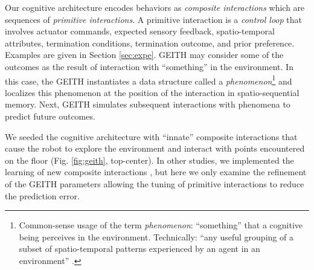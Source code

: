 \documentclass[runningheads]{llncs}
\begin{document}
Our cognitive architecture encodes behaviors as \textit{composite interactions} which are sequences of \textit{primitive interactions}.
A primitive interaction is a \textit{control loop} that involves actuator commands, expected sensory feedback, spatio-temporal attributes, termination conditions, termination outcome, and prior preference. 
Examples are given in Section \ref{sec:expe}. 
 GEITH may consider some of the outcomes as the result of interaction with ``something'' in the environment.
In this case, the GEITH instantiates a data structure called a \textit{phenomenon}\footnote{Common-sense usage of the term \textit{phenomenon}: ``something'' that a cognitive being perceives in the environment. Technically: ``any useful grouping of a subset of spatio-temporal patterns experienced by an agent in an environment'' \cite[p. 8]{thorisson_explanation_2021}.} and localizes this phenomenon at the position of the interaction in spatio-sequential memory.
Next, GEITH simulates subsequent interactions with phenomena to predict future outcomes. 

We seeded the cognitive architecture with ``innate'' composite interactions that cause the robot to explore the environment and interact with points encountered on the floor (Fig. \ref{fig:geith}, top-center). 
In other studies, we implemented the learning of new composite interactions \cite{georgeon_cash_2019}, but here we only examine the refinement of the GEITH parameters allowing the tuning of primitive interactions to reduce the prediction error.
\end{document}
